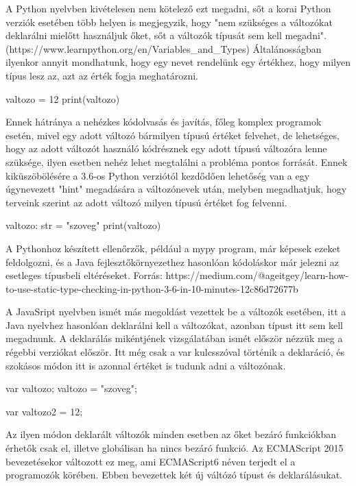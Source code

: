 A Python nyelvben kivételesen nem kötelező ezt megadni, sőt a korai Python verziók esetében több helyen is megjegyzik, hogy "nem szükséges a változókat deklarálni mielőtt használjuk őket, sőt a változók típusát sem kell megadni". (https://www.learnpython.org/en/Variables\_and\_Types)
Általánosságban ilyenkor annyit mondhatunk, hogy egy nevet rendelünk egy értékhez, hogy milyen típus lesz az, azt az érték fogja meghatározni.

\begin{cpp}
	valtozo = 12
	print(valtozo)
\end{cpp}

Ennek hátránya a nehézkes kódolvasás és javítás, főleg komplex programok esetén, mivel egy adott változó bármilyen típusú értéket felvehet, de lehetséges, hogy az adott változót használó kódrésznek egy adott típusú változóra lenne szüksége, ilyen esetben nehéz lehet megtalálni a probléma pontos forrását. Ennek kiküszöbölésére a 3.6-os Python verziótól kezdődően lehetőség van a egy úgynevezett "hint" megadására a változónevek után, melyben megadhatjuk, hogy terveink szerint az adott változó milyen típusú értéket fog felvenni.

\begin{cpp}
	valtozo: str = "szoveg"
	print(valtozo)
\end{cpp}

A Pythonhoz készített ellenőrzők, például a mypy program, már képesek ezeket feldolgozni, és a Java fejlesztőkörnyezethez hasonlóan kódoláskor már jelezni az esetleges típusbeli eltéréseket. Forrás: https://medium.com/@ageitgey/learn-how-to-use-static-type-checking-in-python-3-6-in-10-minutes-12c86d72677b

A JavaSript nyelvben ismét más megoldást vezettek be a változók esetében, itt a Java nyelvhez hasonlóan deklarálni kell a változókat, azonban típust itt sem kell megadnunk. A deklarálás mikéntjének vizsgálatában ismét először nézzük meg a régebbi verziókat először. Itt még csak a var kulcsszóval történik a deklaráció, és szokásos módon itt is azonnal értéket is tudunk adni a változónak.

\begin{cpp}
	var valtozo;
	valtozo = "szoveg";
	
	var valtozo2 = 12;
\end{cpp}

Az ilyen módon deklarált változók minden esetben az őket bezáró funkciókban érhetők csak el, illetve globálisan ha nincs bezáró funkció.
Az ECMAScript 2015 bevezetésekor változott ez meg, ami ECMAScript6 néven terjedt el a programozók körében. Ebben bevezettek két új váltózó típust és deklarálásukat.

